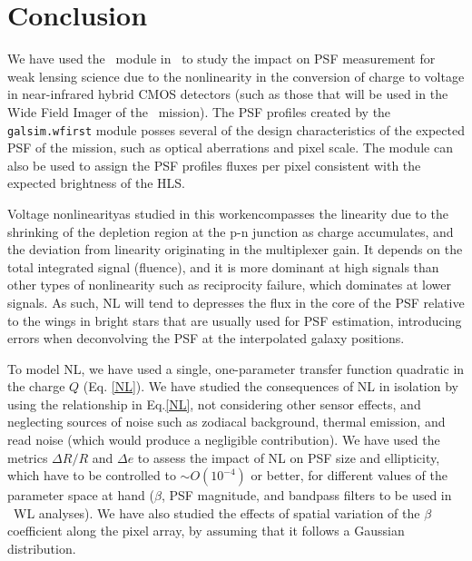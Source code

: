 \documentclass[11pt,preprint,flushrt]{aastex}
\begin{document}
\section{Conclusion}
\label{Conclusion}
We have used the \wfa\ module in \gs\ to study the impact on PSF measurement for weak lensing science due to the nonlinearity in the conversion of charge to voltage in near-infrared hybrid CMOS detectors (such as those that will be used in the Wide Field Imager of the \wfa\ mission). The PSF profiles created by the {\tt{galsim.wfirst}} module posses several of the design characteristics of the expected PSF of the mission, such as optical aberrations and pixel scale. The module can also be used to assign the PSF profiles fluxes per pixel consistent with the expected brightness of the HLS. 

Voltage nonlinearity\textemdash as studied in this work\textemdash encompasses the linearity due to the shrinking of the depletion region at the p-n junction as charge accumulates, and the deviation from linearity originating in the multiplexer gain. It depends on the total integrated signal (fluence), and it is more dominant at high signals than other types of nonlinearity such as reciprocity failure, which dominates at lower signals. As such, NL will tend to depresses the flux in the core of the PSF relative to the wings in bright stars that are usually used for PSF estimation, introducing errors when deconvolving the PSF at the interpolated galaxy positions.

To model NL, we have used a single, one-parameter transfer function quadratic in the charge $Q$ (Eq. \ref{NL}). We have studied the consequences of NL in isolation by using the relationship in Eq.\ref{NL}, not considering other sensor effects, and neglecting sources of noise such as zodiacal background, thermal emission, and read noise (which would produce a negligible contribution). We have used the metrics $\Delta R/R$ and $\Delta e$ to assess the impact of NL on PSF size and ellipticity, which have to be controlled to $\sim O(10^{-4})$ or better, for different values of the parameter space at hand ($\beta$, PSF magnitude, and bandpass filters to be used in \wfa\ WL analyses).  We have also studied the effects of spatial variation of the $\beta$ coefficient along the pixel array, by assuming that it follows a Gaussian distribution. 
\end{document}
